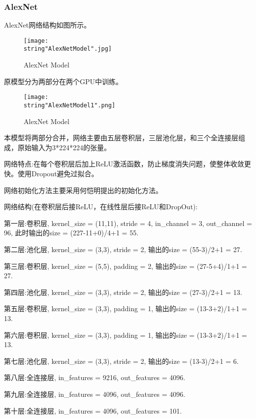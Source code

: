 \documentclass[UTF8]{ctexart}
\begin{document}
\subsubsection{AlexNet}
AlexNet网络结构如图所示。
\begin{figure}[H]
    \begin{center}
        \texttt{[image: \\string"AlexNetModel".jpg]}
    \caption{AlexNet Model}
    \label{fig:1}
    \end{center}
    \end{figure}
\par
原模型分为两部分在两个GPU中训练。
\begin{figure}[H]
    \begin{center}
        \texttt{[image: \\string"AlexNetModel1".png]}
    \caption{AlexNet Model}
    \label{fig:2}
    \end{center}
    \end{figure}
\par

本模型将两部分合并，网络主要由五层卷积层，三层池化层，和三个全连接层组成，原始输入为3*224*224的张量。\par
网络特点:在每个卷积层后加上ReLU激活函数，防止梯度消失问题，使整体收敛更快。使用Dropout避免过拟合。\par 
网络初始化方法主要采用何恺明提出的初始化方法。\par
网络结构(在卷积层后接ReLU，在线性层后接ReLU和DropOut):\par 
第一层:卷积层, kernel\_size = (11,11), stride = 4, in\_channel = 3, out\_channel = 96, 此时输出的size = (227-11+0)/4+1 = 55.\par 
第二层:池化层, kernel\_size = (3,3), stride = 2, 输出的size = (55-3)/2+1 = 27. \par 
第三层:卷积层, kernel\_size = (5,5), padding = 2, 输出的size = (27-5+4)/1+1 = 27. \par 
第四层:池化层, kernel\_size = (3,3), stride = 2, 输出的size = (27-3)/2+1 = 13. \par 
第五层:卷积层, kernel\_size = (3,3), padding = 1, 输出的size = (13-3+2)/1+1 = 13. \par 
第六层:卷积层, kernel\_size = (3,3), padding = 1, 输出的size = (13-3+2)/1+1 = 13. \par 
第七层:池化层, kernel\_size = (3,3), stride = 2, 输出的size = (13-3)/2+1 = 6. \par 
第八层:全连接层, in\_features = 9216, out\_features = 4096. \par 
第九层:全连接层, in\_features = 4096, out\_features = 4096. \par 
第十层:全连接层, in\_features = 4096, out\_features = 101. \par 
\end{document}
